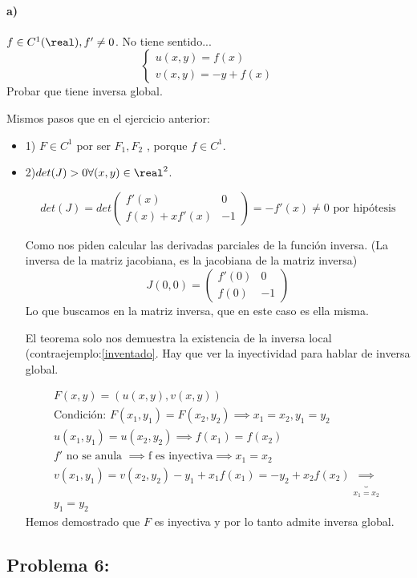 \documentclass{apuntes}
\begin{document}
 \paragraph{a)}
 $f\in C^1(\real), f'\neq0$.
 No tiene sentido...
 $$\left\{\begin{matrix} u(x,y) =f(x)\\v(x,y) = -y + f(x)\end{matrix}\right.$$
 Probar que tiene inversa global.
 
 Mismos pasos que en el ejercicio anterior:
 \begin{itemize}
 \item 1) $F \in C^1$ por ser $F_1,F_2$ , porque $f\in C^1$.
 \item 2)$det(J)>0 \forall (x,y)\in \real^2$.
 
 $$det(J) = det\begin{pmatrix} f'(x)&0\\f(x)+xf'(x)&-1\end{pmatrix} = -f'(x) \neq 0\text{ por hipótesis}$$
 
 Como nos piden calcular las derivadas parciales de la función inversa. (La inversa de la matriz jacobiana, es la jacobiana de la matriz inversa)
 $$J(0,0) = \begin{pmatrix}f'(0) & 0 \\f(0) & -1\end{pmatrix}$$
 Lo que buscamos en la matriz inversa, que en este caso es ella misma.
 
 El teorema solo nos demuestra la existencia de la inversa local (contraejemplo:\ref{inventado}. Hay que ver la inyectividad para hablar de inversa global.
 
\begin{gather*}
F(x,y) = (u(x,y),v(x,y))\\
\text{Condición: }F(x_1,y_1) = F(x_2,y_2) \implies x_1=x_2, y_1=y_2\\
u(x_1,y_1) = u(x_2,y_2) \implies f(x_1) = f(x_2)\\
f' \text{ no se anula } \implies \text{f es inyectiva} \implies x_1=x_2\\
v(x_1,y_1) = v(x_2,y_2) -y_1 + x_1f(x_1) = -y_2 + x_2f(x_2) \underbrace{\implies}_{x_1=x_2}\\
y_1=y_2
\end{gather*}
Hemos demostrado que $F$ es inyectiva y por lo tanto admite inversa global.
 
\end{itemize}


\subsection{Problema 6:}
\end{document}

